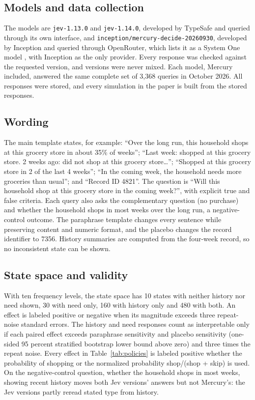 \documentclass[11pt]{article}
\begin{document}
\subsection{Models and data collection}
The models are \texttt{jev-1.13.0} and
\texttt{jev-1.14.0}, developed by TypeSafe and queried through its own interface, and
\texttt{inception/mercury-decide-20260930}, developed by Inception and queried through
OpenRouter, which lists it as a System One model \citep{openrouter_mercury}, with Inception as the
only provider. Every response was checked against the
requested version, and versions were never mixed. Each model, Mercury included, answered the
same complete set of 3,368 queries in October 2026. All responses were stored, and every
simulation in the paper is built from the stored responses.

\subsection{Wording}
The main template states, for example: ``Over the long run, this household shops at
this grocery store in about 35\% of weeks''; ``Last week: shopped at this grocery store. 2 weeks ago: did
not shop at this grocery store\ldots''; ``Shopped at this grocery store in 2 of the last 4 weeks''; ``In
the coming week, the household needs more groceries than usual''; and ``Record ID 4821''. The question is
``Will this household shop at this grocery store in the coming week?'', with explicit true and false
criteria. Each query also asks the complementary question (no purchase) and whether the household
shops in most weeks over the long run, a negative-control outcome. The paraphrase template changes every
sentence while preserving content and numeric format, and the placebo changes the record identifier to 7356.
History summaries are computed from the four-week record, so no inconsistent state can be shown.

\subsection{State space and validity}
With ten frequency levels, the state space has 10 states with
neither history nor need shown, 30 with need only, 160 with history only and 480 with both. An effect is
labeled positive or negative when its magnitude exceeds three repeat-noise standard errors. The history
and need responses count as interpretable only if each paired effect exceeds paraphrase sensitivity and
placebo sensitivity (one-sided 95 percent stratified bootstrap lower bound above zero) and three times
the repeat noise. Every effect in Table~\ref{tab:policies} is labeled positive whether the probability of
shopping or the normalized probability shop/(shop + skip) is used. On the
negative-control question, whether the household shops in most weeks, showing recent history
moves both Jev versions' answers but not Mercury's: the Jev versions partly reread stated type
from history.
\end{document}
